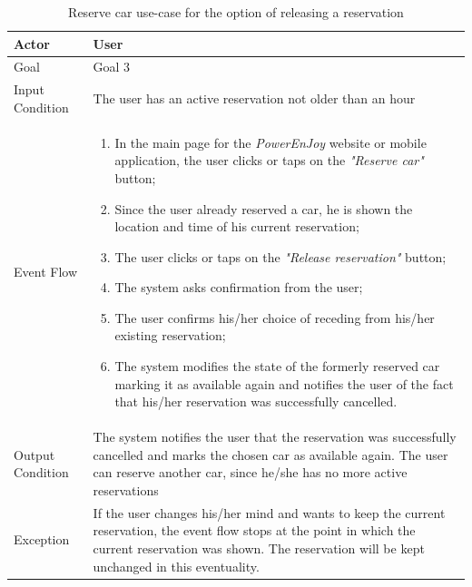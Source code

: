 \begin{table}[H]
\begin{center}
\begin{tabular}{p{} | p{}}
\hline
Actor & User\\
\hline
Goal & Goal 3\\
\hline
Input Condition & The user has an active reservation not older than an hour\\
\hline
Event Flow & 
\begin{enumerate}
\item In the main page for the \emph{PowerEnJoy} website or mobile application, the user clicks or taps on the \emph{"Reserve car"} button;
\item Since the user already reserved a car, he is shown the location and time of his current reservation;
\item The user clicks or taps on the \emph{"Release reservation"} button;
\item The system asks confirmation from the user;
\item The user confirms his/her choice of receding from his/her existing reservation;
\item The system modifies the state of the formerly reserved car marking it as available again and notifies the user of the fact that his/her reservation was successfully cancelled.
\end{enumerate} \\
\hline
Output Condition & The system notifies the user that the reservation was successfully cancelled and marks the chosen car as available again. The user can reserve another car, since he/she has no more active reservations\\
\hline
Exception & If the user changes his/her mind and wants to keep the current reservation, the event flow stops at the point in which the current reservation was shown. The reservation will be kept unchanged in this eventuality.\\
\hline
\end{tabular}
\end{center}
\caption{Reserve car use-case for the option of releasing a reservation}
\label{reserve_car_uc_alt}
\end{table}

